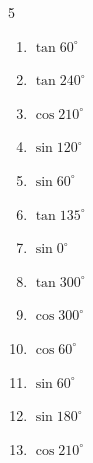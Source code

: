 \begin{multicols}{5}
\begin{enumerate}
  \item $\displaystyle \tan{60^\circ}$


  \item $\displaystyle \tan{240^\circ}$


  \item $\displaystyle \cos{210^\circ}$


  \item $\displaystyle \sin{120^\circ}$


\columnbreak %

  \item $\displaystyle \sin{60^\circ}$


  \item $\displaystyle \tan{135^\circ}$

        \phantom{$\displaystyle =-1$}

  \item $\displaystyle \sin{0^\circ}$

        \phantom{$\displaystyle =0$}

  \item $\displaystyle \tan{300^\circ}$


  \item $\displaystyle \cos{300^\circ}$


  \item $\displaystyle \cos{60^\circ}$


  \item $\displaystyle \sin{60^\circ}$


  \item $\displaystyle \sin{180^\circ}$

        \phantom{$\displaystyle =0$}

  \item $\displaystyle \cos{210^\circ}$


\end{enumerate}
\end{multicols}
